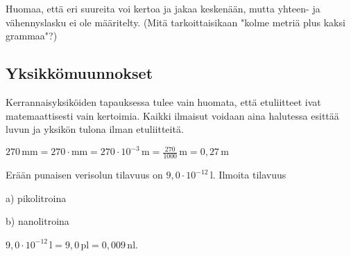 



Huomaa, että eri suureita voi kertoa ja jakaa keskenään, mutta yhteen- ja vähennyslasku ei ole määritelty. (Mitä tarkoittaisikaan "kolme metriä plus kaksi grammaa"?)

\subsection*{Yksikkömuunnokset}

Kerrannaisyksiköiden tapauksessa tulee vain huomata, että etuliitteet ivat matemaattisesti vain kertoimia. Kaikki ilmaisut voidaan aina halutessa esittää luvun ja yksikön tulona ilman etuliitteitä. %

\begin{esimerkki}
$270\,\text{mm}=270\cdot\text{mm}=270\cdot10^{-3}\,\text{m}=\frac{270}{1000}\,\text{m}=0,27\,\text{m}$
\end{esimerkki}

\begin{esimerkki}
Erään punaisen verisolun tilavuus on $9,0 \cdot 10^{-12}\,\textrm{l}$. Ilmoita tilavuus

a) pikolitroina

b) nanolitroina

\begin{esimratk}
$9,0 \cdot 10^{-12}\,\textrm{l} = 9,0\,\textrm{pl} = 0,009\,\textrm{nl}$.
\end{esimratk}
\end{esimerkki}


